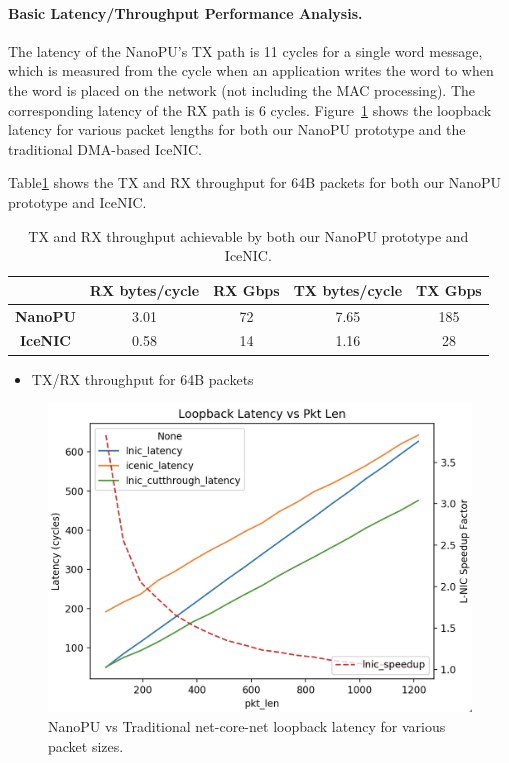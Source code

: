 \paragraph{Basic Latency/Throughput Performance Analysis.} The latency of the NanoPU's TX path is 11 cycles for a single word message, which is measured from the cycle when an application writes the word to when the word is placed on the network (not including the MAC processing). The corresponding latency of the RX path is 6 cycles. Figure~\ref{fig:loopback-latency} shows the loopback latency for various packet lengths for both our NanoPU prototype and the traditional DMA-based IceNIC.

Table\ref{tab:throughput} shows the TX and RX throughput for 64B packets for both our NanoPU prototype and IceNIC. 

\begin{table}[]
\begin{center}
\begin{tabular}{|c|c|c|c|c|}
\hline
                & \textbf{RX bytes/cycle} & \textbf{RX Gbps} & \textbf{TX bytes/cycle} & \textbf{TX Gbps} \\ \hline
\textbf{NanoPU} & 3.01                    & 72               & 7.65                    & 185              \\ \hline
\textbf{IceNIC} & 0.58                    & 14               & 1.16                    & 28               \\ \hline
\end{tabular}
\caption{TX and RX throughput achievable by both our NanoPU prototype and IceNIC.}
\label{tab:throughput}
\end{center}
\end{table}

\begin{itemize}
    \item TX/RX throughput for 64B packets
\end{itemize}

\begin{figure}
  \includegraphics[width=\linewidth]{./figures/loopback-latency}
  \caption{NanoPU vs Traditional net-core-net loopback latency for various packet sizes.}
  \label{fig:loopback-latency}
\end{figure}

